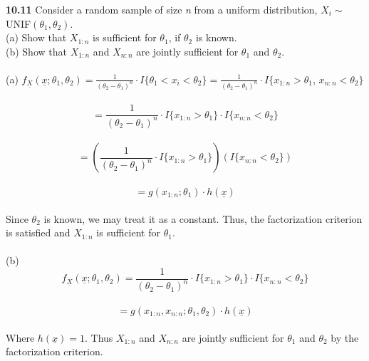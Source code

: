 
{ \bf 10.11 } Consider a random sample of size {\it n} from a uniform distribution, $ X_{i} \sim $ UNIF$ (\theta_{1},\theta_{2}) $.
\\ \indent (a) Show that $ X_{1:n} $ is sufficient for $ \theta_{1} $, if $ \theta_{2} $ is known.
\\ \indent (b) Show that $ X_{1:n} $ and $ X_{n:n} $ are jointly sufficient for $ \theta_{1} $ and $ \theta_{2} $.
\\
\\ (a) $ f_{\underline{X}}(\underline{x}; \theta_{1}, \theta_{2}) = \frac{1}{(\theta_{2}-\theta_{1})^{n}} \cdot I \{\theta_{1} < x_{i} < \theta_{2} \} = \frac{1}{(\theta_{2}-\theta_{1})^{n}} \cdot I \{x_{1:n} > \theta_{1} $, $ x_{n:n} < \theta_{2} \} $
\ $$ = \frac{1}{(\theta_{2}-\theta_{1})^{n}} \cdot I \{x_{1:n} > \theta_{1} \} \cdot I \{x_{n:n} < \theta_{2} \} $$
\ $$ = \left(\frac{1}{(\theta_{2}-\theta_{1})^{n}} \cdot I \{x_{1:n} > \theta_{1} \} \right) \left(I \{x_{n:n} < \theta_{2} \} \right) $$
\ $$ = g(x_{1:n}; \theta_{1}) \cdot h(\underline{x}) $$
\\ Since $ \theta_{2} $ is known, we may treat it as a constant.  Thus, the factorization criterion is satisfied and $ X_{1:n} $ is sufficient for $ \theta_{1} $.
\\
\\ (b) $$ f_{\underline{X}}(\underline{x}; \theta_{1}, \theta_{2}) = \frac{1}{(\theta_{2}-\theta_{1})^{n}} \cdot I \{x_{1:n} > \theta_{1} \} \cdot I \{x_{n:n} < \theta_{2} \} $$
\ $$ = g(x_{1:n}, x_{n:n}; \theta_{1}, \theta_{2}) \cdot h(\underline{x}) $$
\\ Where $ h(\underline{x}) = 1 $.  Thus $ X_{1:n} $ and $ X_{n:n} $ are jointly sufficient for $ \theta_{1} $ and $ \theta_{2} $ by the factorization criterion.
